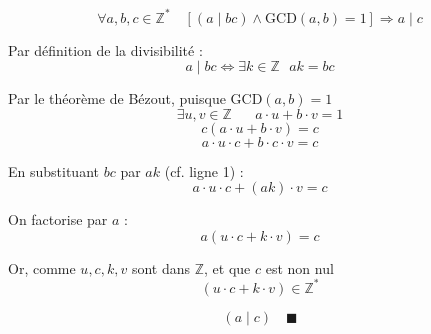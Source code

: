 \documentclass{article}
\begin{document}
\[
\boxed{
    \forall a, b, c \in \mathbb{Z}^* \quad [(a \mid bc) \land \text{GCD}(a,b)=1] \Rightarrow a \mid c
}
\]

\vspace{1cm} %

Par définition de la divisibilité :
\[ a \mid bc \Leftrightarrow \exists k \in \mathbb{Z} \text{  } ak = bc \]

Par le théorème de Bézout, puisque $\text{GCD}(a,b)=1$
\[ \exists u, v \in \mathbb{Z} \quad \text{  } a \cdot u + b \cdot v = 1 \]
\[ c(a \cdot u + b \cdot v) = c \]
\[ a \cdot u \cdot c + b \cdot c \cdot v = c \]

En substituant $bc$ par $ak$ (cf. ligne 1) :
\[ a \cdot u \cdot c + (ak) \cdot v = c \]

On factorise par $a$ :
\[ a (u \cdot c + k \cdot v) = c \]

Or, comme $u, c, k, v$ sont dans $\mathbb{Z}$, et que $c$ est non nul \[ (u \cdot c + k \cdot v) \in \mathbb{Z}^* \]

\[ (a \mid c) \quad \blacksquare \]
\end{document}
